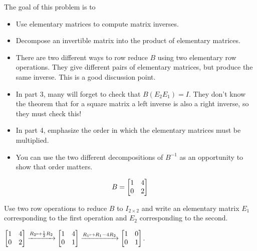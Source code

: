 \documentclass{workbook}
\newcommand{\displayonlynewpage}{\begin{displayonly}\newpage\end{displayonly}}
\newcommand{\bookonlynewpage}{\begin{bookonly}\newpage\end{bookonly}}
\begin{document}
\begin{slide}
	\bookonlynewpage
	\displayonlynewpage
	\question
	\begin{annotation}
		\begin{goals}

			The goal of this problem is to
			\begin{itemize}
				\item Use elementary matrices to compute matrix inverses.
				\item Decompose an invertible matrix into the product of elementary matrices.
			\end{itemize}
		\end{goals}

		\begin{notes}
			\begin{itemize}
				\item There are two different ways to row reduce $B$ using two elementary row
					operations. They give different pairs of elementary matrices, but produce
					the same inverse. This is a good discussion point.
				\item In part 3, many will forget to check that $B(E_2E_1)=I$. They don't know
					the theorem that for a square matrix a left inverse is also a right inverse,
					so they must check this!
				\item In part 4, emphasize the order in which the elementary matrices must be multiplied.
				\item You can use the two different decompositions of $B^{-1}$ as an opportunity to
					show that order matters.
			\end{itemize}
		\end{notes}
	\end{annotation}
	\[
		B=\mat{1 &4\\0 &2}
	\]
	\begin{parts}
		\item Use two row operations to reduce $B$ to $I_{2\times 2}$ and write
			an elementary matrix $E_1$ corresponding to the first operation and
			$E_2$ corresponding to the second.
			\begin{solution}
				$\mat{1&4\\0&2}\xrightarrow{R_2\mapsto \frac{1}{2}R_2}\mat{1&4\\0&1}
				\xrightarrow{R_1\mapsto R_1-4R_2}\mat{1&0\\0&1}$.


\end{solution}
\end{parts}
\end{slide}
\end{document}
